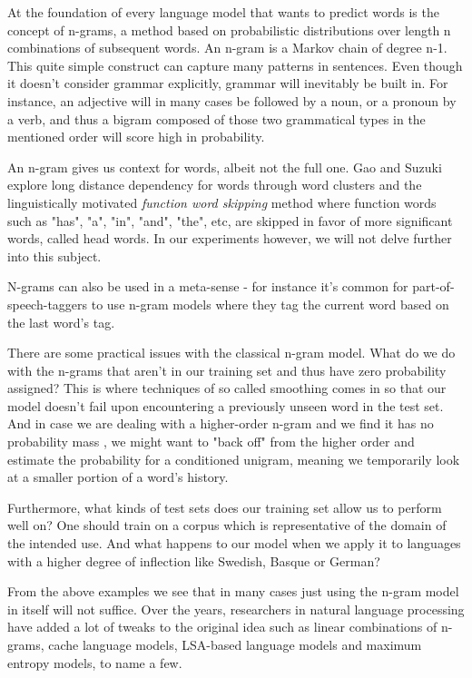 \documentclass[a4paper,12pt]{article}
\begin{document}
At the foundation of every language model that wants to predict words is the concept of n-grams, a method based on probabilistic distributions over length n combinations of subsequent words. An n-gram is a Markov chain of degree n-1. This quite simple construct can capture many patterns in sentences. Even though it doesn't consider grammar explicitly, grammar will inevitably be built in. For instance, an adjective will in many cases be followed by a noun, or a pronoun by a verb, and thus a bigram composed of those two grammatical types in the mentioned order will score high in probability. 

An n-gram gives us context for words, albeit not the full one. Gao and Suzuki\cite{gao2004long} explore long distance dependency for words through word clusters and the linguistically motivated {\it function word skipping} method where function words such as "has", "a", "in", "and", "the", etc, are skipped in favor of more significant words, called head words. In our experiments however, we will not delve further into this subject.

N-grams can also be used in a meta-sense - for instance it's common for part-of-speech-taggers to use n-gram models where they tag the current word based on the last word's tag.

There are some practical issues with the classical n-gram model. What do we do with the n-grams that aren't in our training set and thus have zero probability assigned? This is where techniques of so called smoothing comes in so that our model doesn't fail upon encountering a previously unseen word in the test set. And in case we are dealing with a higher-order n-gram and we find it has no probability mass , we might want to "back off" from the higher order and estimate the probability for a conditioned unigram, meaning we temporarily look at a smaller portion of a word's history.

Furthermore, what kinds of test sets does our training set allow us to perform well on? One should train on a  corpus which is representative of the domain of the intended use. And what happens to our model when we apply it to languages with a higher degree of inflection like Swedish, Basque or German?

From the above examples we see that in many cases just using the n-gram model in itself will not suffice. Over the years, researchers in natural language processing have added a lot of tweaks to the original idea such as linear combinations of n-grams, cache language models, LSA-based language models and maximum entropy models, to name a few.
\end{document}
